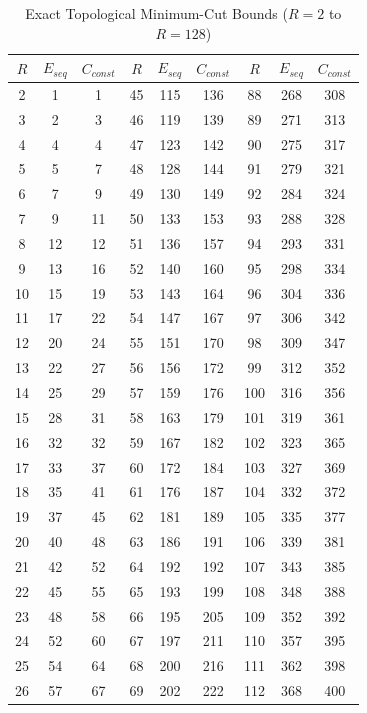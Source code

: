 \begin{table}[H]
\centering
\caption{Exact Topological Minimum-Cut Bounds ($R=2$ to $R=128$)}
\small
\begin{tabular}{ccc|ccc|ccc}
\toprule
$R$ & $E_{seq}$ & $C_{const}$ & $R$ & $E_{seq}$ & $C_{const}$ & $R$ & $E_{seq}$ & $C_{const}$ \\
\midrule
2 & 1 & 1 & 45 & 115 & 136 & 88 & 268 & 308 \\
3 & 2 & 3 & 46 & 119 & 139 & 89 & 271 & 313 \\
4 & 4 & 4 & 47 & 123 & 142 & 90 & 275 & 317 \\
5 & 5 & 7 & 48 & 128 & 144 & 91 & 279 & 321 \\
6 & 7 & 9 & 49 & 130 & 149 & 92 & 284 & 324 \\
7 & 9 & 11 & 50 & 133 & 153 & 93 & 288 & 328 \\
8 & 12 & 12 & 51 & 136 & 157 & 94 & 293 & 331 \\
9 & 13 & 16 & 52 & 140 & 160 & 95 & 298 & 334 \\
10 & 15 & 19 & 53 & 143 & 164 & 96 & 304 & 336 \\
11 & 17 & 22 & 54 & 147 & 167 & 97 & 306 & 342 \\
12 & 20 & 24 & 55 & 151 & 170 & 98 & 309 & 347 \\
13 & 22 & 27 & 56 & 156 & 172 & 99 & 312 & 352 \\
14 & 25 & 29 & 57 & 159 & 176 & 100 & 316 & 356 \\
15 & 28 & 31 & 58 & 163 & 179 & 101 & 319 & 361 \\
16 & 32 & 32 & 59 & 167 & 182 & 102 & 323 & 365 \\
17 & 33 & 37 & 60 & 172 & 184 & 103 & 327 & 369 \\
18 & 35 & 41 & 61 & 176 & 187 & 104 & 332 & 372 \\
19 & 37 & 45 & 62 & 181 & 189 & 105 & 335 & 377 \\
20 & 40 & 48 & 63 & 186 & 191 & 106 & 339 & 381 \\
21 & 42 & 52 & 64 & 192 & 192 & 107 & 343 & 385 \\
22 & 45 & 55 & 65 & 193 & 199 & 108 & 348 & 388 \\
23 & 48 & 58 & 66 & 195 & 205 & 109 & 352 & 392 \\
24 & 52 & 60 & 67 & 197 & 211 & 110 & 357 & 395 \\
25 & 54 & 64 & 68 & 200 & 216 & 111 & 362 & 398 \\
26 & 57 & 67 & 69 & 202 & 222 & 112 & 368 & 400 \\

\end{tabular}
\end{table}
